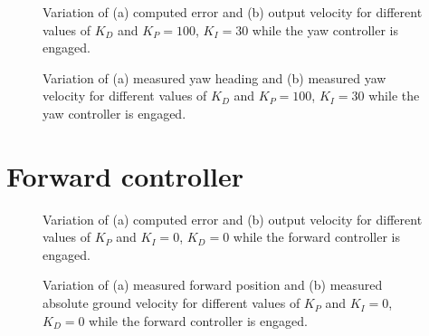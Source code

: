 \begin{figure}[H]
    \begin{minipage}[t]{0.5\linewidth}
        \centering
        \scalebox{0.55}{}
    \end{minipage}
    \begin{minipage}[t]{0.5\linewidth}
        \centering
        \scalebox{0.55}{}
    \end{minipage}
    \caption{Variation of (a) computed error and (b) output velocity for different values of $K_{D}$ and $K_P=100$, $K_I=30$ while the yaw controller is engaged.}
    \label{fig:tune-yaw-der-io}
\end{figure}
\begin{figure}[H]
    \begin{minipage}[t]{0.5\linewidth}
        \centering
        \scalebox{0.55}{}
    \end{minipage}
    \begin{minipage}[t]{0.5\linewidth}
        \centering
        \scalebox{0.55}{}
    \end{minipage}
    \caption{Variation of (a) measured yaw heading and (b) measured yaw velocity for different values of $K_{D}$ and $K_P=100$, $K_I=30$ while the yaw controller is engaged.}
    \label{fig:tune-yaw-der-measures}
\end{figure}

\section{Forward controller}
\label{app:fwd-pid-results}

\begin{figure}[H]
    \begin{minipage}[t]{0.5\linewidth}
        \centering
        \scalebox{0.55}{}
    \end{minipage}
    \begin{minipage}[t]{0.5\linewidth}
        \centering
        \scalebox{0.55}{}
    \end{minipage}
    \caption{Variation of (a) computed error and (b) output velocity for different values of $K_{P}$ and $K_I=0$, $K_D=0$ while the forward controller is engaged.}
    \label{fig:tune-fwd-prop-io}
\end{figure}
\begin{figure}[H]
    \begin{minipage}[t]{0.5\linewidth}
        \centering
        \scalebox{0.55}{}
    \end{minipage}
    \begin{minipage}[t]{0.5\linewidth}
        \centering
        \scalebox{0.55}{}
    \end{minipage}
    \caption{Variation of (a) measured forward position and (b) measured absolute ground velocity for different values of $K_{P}$ and $K_I=0$, $K_D=0$ while the forward controller is engaged.}
    \label{fig:tune-fwd-prop-measures}
\end{figure}


